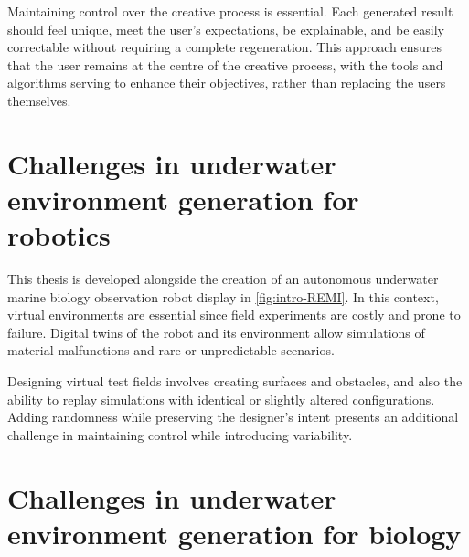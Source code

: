 Maintaining control over the creative process is essential. Each generated result should feel unique, meet the user's expectations, be explainable, and be easily correctable without requiring a complete regeneration. This approach ensures that the user remains at the centre of the creative process, with the tools and algorithms serving to enhance their objectives, rather than replacing the users themselves.

\section{Challenges in underwater environment generation for robotics}

This thesis is developed alongside the creation of an autonomous underwater marine biology observation robot display in \cref{fig:intro-REMI}. In this context, virtual environments are essential since field experiments are costly and prone to failure. Digital twins of the robot and its environment allow simulations of material malfunctions and rare or unpredictable scenarios.


Designing virtual test fields involves creating surfaces and obstacles, and also the ability to replay simulations with identical or slightly altered configurations. Adding randomness while preserving the designer's intent presents an additional challenge in maintaining control while introducing variability.

\section{Challenges in underwater environment generation for biology}


